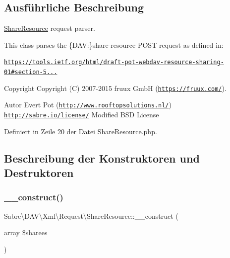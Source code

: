 \subsection{Ausführliche Beschreibung}
\mbox{\hyperlink{class_sabre_1_1_d_a_v_1_1_xml_1_1_request_1_1_share_resource}{Share\+Resource}} request parser.

This class parses the \{D\+AV\+:\}share-\/resource P\+O\+ST request as defined in\+:

\href{https://tools.ietf.org/html/draft-pot-webdav-resource-sharing-01#section-5.3.2.1}{\tt https\+://tools.\+ietf.\+org/html/draft-\/pot-\/webdav-\/resource-\/sharing-\/01\#section-\/5...}

\begin{DoxyCopyright}{Copyright}
Copyright (C) 2007-\/2015 fruux GmbH (\href{https://fruux.com/}{\tt https\+://fruux.\+com/}). 
\end{DoxyCopyright}
\begin{DoxyAuthor}{Autor}
Evert Pot (\href{http://www.rooftopsolutions.nl/}{\tt http\+://www.\+rooftopsolutions.\+nl/})  \href{http://sabre.io/license/}{\tt http\+://sabre.\+io/license/} Modified B\+SD License 
\end{DoxyAuthor}


Definiert in Zeile 20 der Datei Share\+Resource.\+php.



\subsection{Beschreibung der Konstruktoren und Destruktoren}
\mbox{\label{class_sabre_1_1_d_a_v_1_1_xml_1_1_request_1_1_share_resource_a16cd8e612168680292152ce302f1a43e}} 
\subsubsection{\texorpdfstring{\+\_\+\+\_\+construct()}{\_\_construct()}}
{\footnotesize\ttfamily Sabre\textbackslash{}\+D\+A\+V\textbackslash{}\+Xml\textbackslash{}\+Request\textbackslash{}\+Share\+Resource\+::\+\_\+\+\_\+construct (\begin{DoxyParamCaption}\item[{array}]{\$sharees }\end{DoxyParamCaption})}

